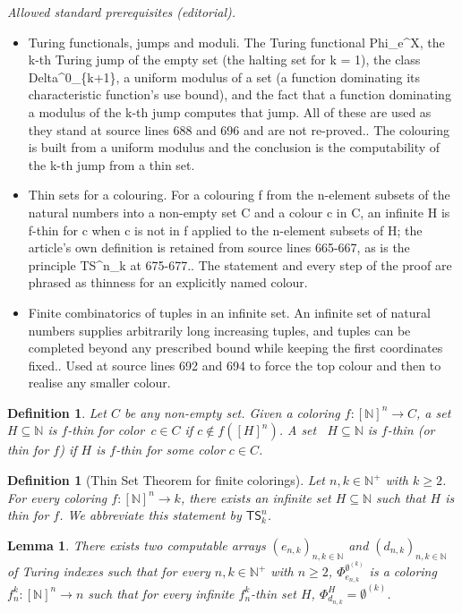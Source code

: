 \documentclass{article}
\newcommand{\TS}[0]{\mathsf{TS}}
\newcommand{\NN}[0]{\mathbb{N}}
\numberwithin{theorem}{section}
\newtheorem{lemma}[theorem]{Lemma}
\newtheorem{definition}[theorem]{Definition}
\begin{document}
\noindent\textit{Allowed standard prerequisites (editorial).}\begin{itemize}
\item Turing functionals, jumps and moduli. The Turing functional Phi\_e\textasciicircum{}X, the k-th Turing jump of the empty set (the halting set for k = 1), the class Delta\textasciicircum{}0\_\{k+1\}, a uniform modulus of a set (a function dominating its characteristic function's use bound), and the fact that a function dominating a modulus of the k-th jump computes that jump. All of these are used as they stand at source lines 688 and 696 and are not re-proved.. The colouring is built from a uniform modulus and the conclusion is the computability of the k-th jump from a thin set.
\item Thin sets for a colouring. For a colouring f from the n-element subsets of the natural numbers into a non-empty set C and a colour c in C, an infinite H is f-thin for c when c is not in f applied to the n-element subsets of H; the article's own definition is retained from source lines 665-667, as is the principle TS\textasciicircum{}n\_k at 675-677.. The statement and every step of the proof are phrased as thinness for an explicitly named colour.
\item Finite combinatorics of tuples in an infinite set. An infinite set of natural numbers supplies arbitrarily long increasing tuples, and tuples can be completed beyond any prescribed bound while keeping the first coordinates fixed.. Used at source lines 692 and 694 to force the top colour and then to realise any smaller colour.
\end{itemize}\medskip
\begin{definition}
Let $C$ be any non-empty set. Given a coloring $f : [\NN]^n \to C$, a set~$H \subseteq \NN$ is \emph{$f$-thin for color~$c \in C$} if $c \not \in f([H]^n)$. A set ~$H \subseteq \NN$ is $f$-thin (or thin for $f$) if $H$ is $f$-thin for some color $c\in C$.
\end{definition}

\begin{definition}[Thin Set Theorem for finite colorings]\label{def:ts-finite}
Let $n, k\in \NN^+$ with $k\geq 2$. For every coloring $f : [\NN]^n \to k$, there exists an infinite set $H \subseteq \NN$ such that $H$ is thin for $f$. We abbreviate this statement by $\TS^n_{k}$.
\end{definition}

\begin{lemma}\label{lem:arrays}
    There exists two computable arrays $(e_{n,k})_{n,k \in \NN}$ and $(d_{n,k})_{n,k \in \NN}$ of Turing indexes such that for every $n, k \in \NN^+$ with $n \geq 2$, $\Phi_{e_{n,k}}^{\emptyset^{(k)}}$ is a coloring $f_n^k : [\NN]^{n} \to n$ such that for every infinite $f_n^k$-thin set $H$, $\Phi_{d_{n,k}}^{H} = \emptyset^{(k)}$.
\end{lemma}
\end{document}
